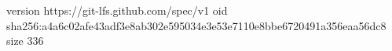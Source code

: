 version https://git-lfs.github.com/spec/v1
oid sha256:a4a6c02afe43adf3e8ab302e595034e3e53e7110e8bbe6720491a356eaa56dc8
size 336

